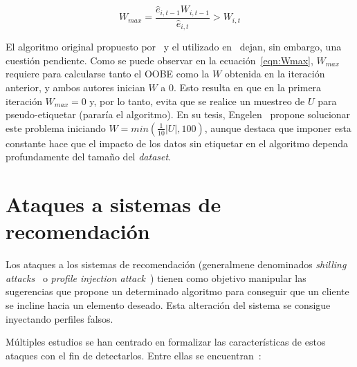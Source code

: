 \begin{equation}\label{eqn:Wmax} W_{max} = \frac{\hat{e}_{i,t-1}W_{i,t-1}}{\hat{e}_{i, t}} > W_{i,t} \end{equation}


\label{parag:Wmax_inicial} El algoritmo original propuesto por~\cite{originalCoForest2007} y el utilizado en~\cite{zhou2021SemisupervisedRecommendationAttack} dejan, sin embargo, una cuestión pendiente. Como se puede observar en la ecuación~\ref{eqn:Wmax}, $W_{max}$ requiere para calcularse tanto el OOBE como la $W$ obtenida en la iteración anterior, y ambos autores inician $W$ a 0. Esto resulta en que en la primera iteración $W_{max} = 0$ y, por lo tanto, evita que se realice un muestreo de $U$ para pseudo-etiquetar (pararía el algoritmo). En su tesis, Engelen~\cite{engelen2018thesis} propone solucionar este problema iniciando $W = min(\frac{1}{10}|U|, 100)$, aunque destaca que imponer esta constante hace que el impacto de los datos sin etiquetar en el algoritmo dependa profundamente del tamaño del \textit{dataset}.

\section{Ataques a sistemas de recomendación}

Los ataques a los sistemas de recomendación (generalmene denominados \textit{shilling attacks}~\cite{mingdan2018ShillingAttacksAReview} o \textit{profile injection attack}~\cite{Mobasher2006Thesis}) tienen como objetivo manipular las sugerencias que propone un determinado algoritmo para conseguir que un cliente se incline hacia un elemento deseado. Esta alteración del sistema se consigue inyectando perfiles falsos.

Múltiples estudios se han centrado en formalizar las características de estos ataques con el fin de detectarlos. Entre ellas se encuentran~\cite{mingdan2018ShillingAttacksAReview}:

